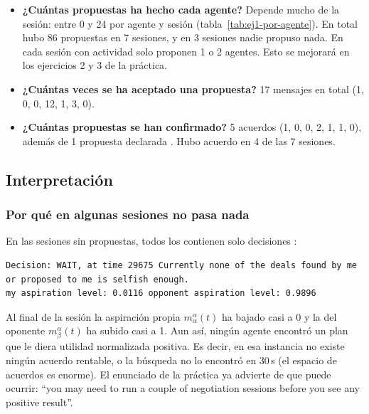 \begin{itemize}
  \item \textbf{¿Cuántas propuestas ha hecho cada agente?} Depende mucho de la sesión: entre 0 y 24
        por agente y sesión (tabla~\ref{tab:ej1-por-agente}). En total hubo 86 propuestas en 7
        sesiones, y en 3 sesiones nadie propuso nada. En cada sesión con actividad solo proponen 1 o
        2 agentes. Esto se mejorará en los ejercicios 2 y 3 de la práctica.
  \item \textbf{¿Cuántas veces se ha aceptado una propuesta?} 17 mensajes  en total
        (1, 0, 0, 12, 1, 3, 0).
  \item \textbf{¿Cuántas propuestas se han confirmado?} 5 acuerdos (1, 0, 0, 2, 1, 1, 0), además de
        1 propuesta declarada . Hubo acuerdo en 4 de las 7 sesiones.
\end{itemize}

\subsection{Interpretación}
\label{sec:ej1-interpretacion}

\subsubsection{Por qué en algunas sesiones no pasa nada}
\label{sec:ej1-sin-actividad}

En las sesiones sin propuestas, todos los  contienen solo decisiones :

\begin{lstlisting}
Decision: WAIT, at time 29675 Currently none of the deals found by me or proposed to me is selfish enough.
my aspiration level: 0.0116 opponent aspiration level: 0.9896
\end{lstlisting}

Al final de la sesión la aspiración propia $m^{\alpha}_{\alpha}(t)$ ha bajado casi a 0 y la del
oponente $m^{\alpha}_{\beta}(t)$ ha subido casi a 1. Aun así, ningún agente encontró un plan que le
diera utilidad normalizada positiva. Es decir, en esa instancia no existe ningún acuerdo rentable, o
la búsqueda no lo encontró en 30\,s (el espacio de acuerdos es enorme). El enunciado de la práctica
ya advierte de que puede ocurrir: \foreignquote{english}{you may need to run a couple of negotiation
sessions before you see any positive result}.

